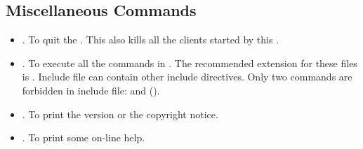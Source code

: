 \subsection{\OPRSS{} Miscellaneous Commands}

\begin{itemize}

\item {}. To quit the \OPRSS{}. This also kills
all the \COPRS{} clients started by this \OPRSS{}.

\item {}. To execute all the commands in
. The recommended extension for these files is .
Include file can contain other include directives. Only two commands are
forbidden in include file:  and 
().

\item {}. To print the version or the copyright
notice.

\item {}. To print some on-line help.

\end{itemize}


